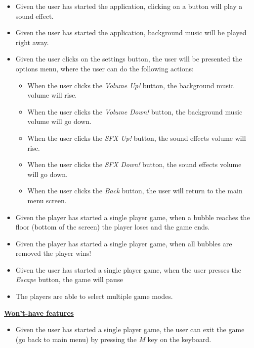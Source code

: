 \documentclass[a4paper,11pt]{article}
\begin{document}
\begin{itemize}
  \item Given the user has started the application, clicking on a button will play a sound effect.
  \item Given the user has started the application, background music will be played right away.
  \item Given the user clicks on the settings button, the user will be presented the options menu, where the user can do the following actions:
    \begin{itemize}
    \item When the user clicks the \textit{Volume Up!} button, the background music volume will rise.
    \item When the user clicks the \textit{Volume Down!} button, the background music volume will go down.
    \item When the user clicks the \textit{SFX Up!} button, the sound effects volume will rise.
    \item When the user clicks the \textit{SFX Down!} button, the sound effects volume will go down.
    \item When the user clicks the \textit{Back} button, the user will return to the main menu screen.
    \end{itemize}
   \item Given the player has started a single player game, when a bubble reaches the floor (bottom of the screen) the player loses and the game ends.
   \item Given the player has started a single player game, when all bubbles are removed the player wins!
   \item Given the user has started a single player game, when the user presses the \textit{Escape} button, the game will pause
   \item The players are able to select multiple game modes. \\
\end{itemize}
\noindent
\textbf{\underline{Won't-have features}}
\begin{itemize}
   \item Given the user has started a single player game, the user can exit the game (go back to main menu) by pressing the \textit{M} key on the keyboard.
\end{itemize}

\newpage
\end{document}

